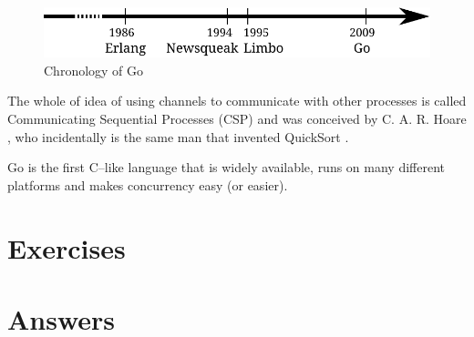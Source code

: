 \begin{figure}[H]
\caption{Chronology of Go}
\label{fig:chrono-of-go}
\begin{center}
\includegraphics[scale=0.65]{fig/go-history.pdf}
\end{center}
\end{figure}

The whole of idea of using channels to communicate with other processes
is called Communicating Sequential Processes (CSP) and was conceived
by C. A. R. Hoare \cite{hoare}, who incidentally is the same man that
invented QuickSort \cite{Quicksort}.

\begin{lbar}[]
Go is the first C--like language that is widely available,
runs on many
different platforms and makes concurrency easy (or easier).
\end{lbar}

\section{Exercises}


\cleardoublepage
\section{Answers}
\shipoutAnswer
